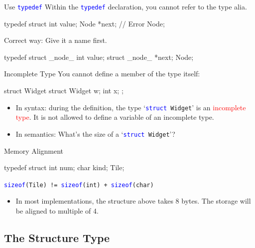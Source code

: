 \documentclass{beamer}
\newcommand{\red}[1]{\textcolor{red}{#1}}
\newcommand{\blue}[1]{\textcolor{blue}{#1}}
\newcommand{\ttt}[1]{\texttt{#1}}
\newcommand{\bluett}[1]{\blue{\ttt{#1}}}
\theoremstyle{definition}
\begin{document}
\begin{frame}[fragile]{Use \bluett{typedef}}
    Within the \bluett{typedef} declaration, you cannot refer to the type alia.
    \begin{cpp}
typedef struct {
  int value;
  Node *next;   // Error
} Node;
    \end{cpp}
    \pause
    Correct way: Give it a name first.
    \begin{cpp}
typedef struct _node_ {
  int value;
  struct _node_ *next;
} Node;
    \end{cpp}
\end{frame}

\begin{frame}[fragile]{Incomplete Type}
    You cannot define a member of the type itself:
    \begin{cpp}
struct Widget {
  struct Widget w;
  int x;
};
    \end{cpp}
    \begin{itemize}
        \item In syntax: during the definition, the type `\bluett{struct }\ttt{Widget}' is an \red{incomplete type}. It is not allowed to define a variable of an incomplete type.
        \item In semantics: What's the size of a `\bluett{struct }\ttt{Widget}'?
    \end{itemize}
\end{frame}

\begin{frame}[fragile]{Memory Alignment}
    \begin{cpp}
typedef struct {
  int num;
  char kind;
} Tile;
    \end{cpp}
    \bluett{sizeof}\ttt{(Tile) != }\bluett{sizeof}\ttt{(int) + }\bluett{sizeof}\ttt{(char)}
    \begin{itemize}
        \item In most implementations, the structure above takes 8 bytes. The storage will be aligned to multiple of 4.
    \end{itemize}
\end{frame}

\subsection{The Structure Type}
\end{document}
